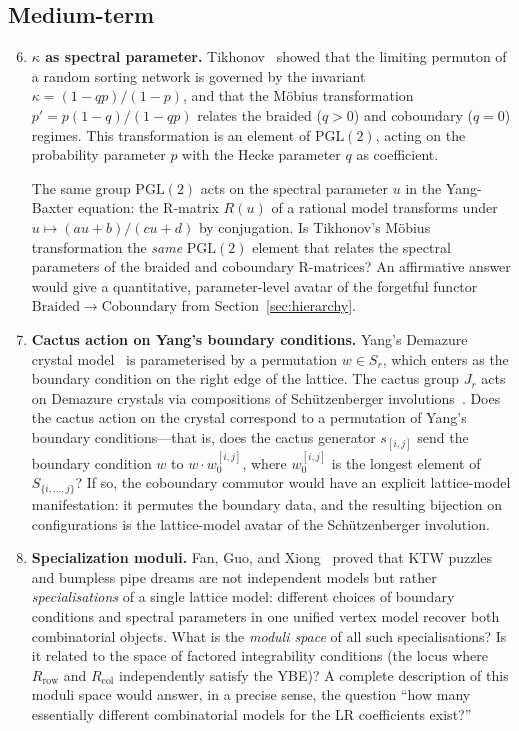 \subsection{Medium-term}

\begin{enumerate}[label=\textbf{Q\arabic*.}, ref=Q\arabic*, leftmargin=3em]
\setcounter{enumi}{5}

\item \label{q:spectral-parameter}
\textbf{$\kappa$ as spectral parameter.}
Tikhonov~\cite{tikhonov-2026} showed that the limiting permuton of a
random sorting network is governed by the invariant
$\kappa = (1 - qp)/(1-p)$, and that the M\"obius transformation
$p' = p(1-q)/(1-qp)$ relates the braided ($q > 0$) and coboundary
($q = 0$) regimes.  This transformation is an element of
$\mathrm{PGL}(2)$, acting on the probability parameter $p$ with the
Hecke parameter $q$ as coefficient.

The same group $\mathrm{PGL}(2)$ acts on the spectral parameter $u$
in the Yang-Baxter equation: the R-matrix $R(u)$ of a rational
model transforms under $u \mapsto (au + b)/(cu + d)$ by
conjugation.  Is Tikhonov's M\"obius transformation the \emph{same}
$\mathrm{PGL}(2)$ element that relates the spectral parameters of the
braided and coboundary R-matrices?  An affirmative answer would give a
quantitative, parameter-level avatar of the forgetful functor
$\mathrm{Braided} \to \mathrm{Coboundary}$ from
Section~\ref{sec:hierarchy}.

\item \label{q:cactus-yang}
\textbf{Cactus action on Yang's boundary conditions.}
Yang's Demazure crystal model~\cite{yang-2025} is parameterised by a
permutation $w \in S_r$, which enters as the boundary condition on the
right edge of the lattice.  The cactus group $J_r$ acts on Demazure
crystals via compositions of Sch\"utzenberger
involutions~\cite{henriques-kamnitzer-2006}.  Does the cactus action
on the crystal correspond to a permutation of Yang's boundary
conditions---that is, does the cactus generator $s_{[i,j]}$ send the
boundary condition $w$ to $w \cdot w_0^{[i,j]}$, where $w_0^{[i,j]}$
is the longest element of $S_{\{i, \ldots, j\}}$?  If so, the
coboundary commutor would have an explicit lattice-model
manifestation: it permutes the boundary data, and the resulting
bijection on configurations is the lattice-model avatar of the
Sch\"utzenberger involution.

\item \label{q:specialization-moduli}
\textbf{Specialization moduli.}
Fan, Guo, and Xiong~\cite{fan-guo-xiong} proved that KTW puzzles and
bumpless pipe dreams are not independent models but rather
\emph{specialisations} of a single lattice model: different choices of
boundary conditions and spectral parameters in one unified vertex model
recover both combinatorial objects.  What is the \emph{moduli space} of
all such specialisations?  Is it related to the space of factored
integrability conditions (the locus where $R_{\mathrm{row}}$ and
$R_{\mathrm{col}}$ independently satisfy the YBE)?  A complete
description of this moduli space would answer, in a precise sense,
the question ``how many essentially different combinatorial models for
the LR coefficients exist?''


\end{enumerate}
